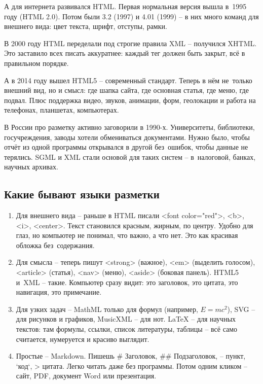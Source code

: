 \documentclass{ou}
\begin{document}
А для интернета развивался HTML. Первая нормальная версия вышла в~1995 году (HTML 2.0). Потом были 3.2 (1997) и 4.01 (1999) -- в них много команд для внешнего вида: цвет текста, шрифт, отступы, рамки.

В 2000 году HTML переделали под строгие правила XML -- получился XHTML. Это заставило всех писать аккуратнее: каждый тег должен быть закрыт, всё в правильном порядке.

А в 2014 году вышел HTML5 -- современный стандарт. Теперь в нём не~только внешний вид, но и смысл: где шапка сайта, где основная статья, где меню, где подвал. Плюс поддержка видео, звуков, анимации, форм, геолокации и работа на телефонах, планшетах, компьютерах.

В России про разметку активно заговорили в 1990-х. Университеты, библиотеки, госучреждения, заводы хотели обмениваться документами. Нужно было, чтобы отчёт из одной программы открывался в другой без~ошибок, чтобы данные не терялись. SGML и XML стали основой для таких систем -- в~налоговой, банках, научных архивах.
\subsection{Какие бывают языки разметки}
\begin{enumerate}[leftmargin=0em, itemindent=3.75em, nosep, label=\arabic*)]
\item Для внешнего вида -- раньше в HTML писали <font color="red">, <b>, <i>, <center>. Текст становился красным, жирным, по центру. Удобно для глаз, но компьютер не понимал, что важно, а что нет. Это как красивая обложка без~содержания.
\item Для смысла -- теперь пишут <strong> (важное), <em> (выделить голосом), <article> (статья), <nav> (меню), <aside> (боковая панель). HTML5 и~XML -- такие. Компьютер сразу видит: это заголовок, это цитата, это навигация, это примечание.
\item Для узких задач -- MathML только для формул (например, $E=mc^2$), SVG -- для рисунков и графиков, MusicXML -- для нот. LaTeX -- для научных текстов: там формулы, ссылки, список литературы, таблицы -- всё само считается, нумеруется и красиво выглядит.
\item Простые -- Markdown. Пишешь \# Заголовок, \#\# Подзаголовок, --  пункт, `код`, > цитата. Легко читать даже без программы. Потом одним кликом -- сайт, PDF, документ Word или презентация.
\end{enumerate}
\end{document}
